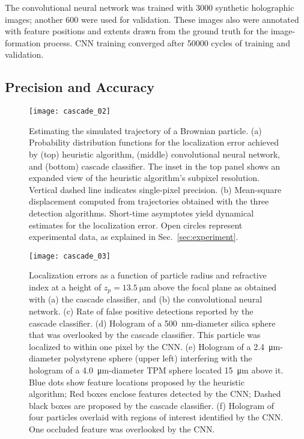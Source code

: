 The convolutional neural network was trained with 
\num{3000} synthetic holographic images; another \num{600} 
were used for validation.
These images also were annotated with feature positions and extents
drawn from the ground truth for the image-formation process.
CNN training converged after \num{50000} cycles
of training and validation.

\subsection{Precision and Accuracy}
  
\begin{figure}[!t]
  \centering
  \texttt{[image: cascade\_02]} %
  \caption{Estimating the simulated trajectory of a Brownian particle.
  (a) Probability distribution functions for the
  localization error achieved by (top) heuristic
  algorithm, (middle) convolutional neural network,
  and (bottom) cascade classifier. 
  The inset in the top panel shows an expanded view of the heuristic algorithm's subpixel
  resolution. Vertical dashed line indicates single-pixel
  precision.
  (b) Mean-square displacement computed from 
  trajectories obtained with the three detection algorithms.
  Short-time asymptotes yield dynamical estimates
  for the localization error.
  Open circles represent experimental data,
  as explained in Sec.~\ref{sec:experiment}\cite{hannel18}.
  }
  \label{fig:msdplot}
\end{figure}

\begin{figure}
  \centering
  \texttt{[image: cascade\_03]}
  \caption{Localization errors as a function of particle
  radius and refractive index at a height of $z_p = \SI{13.5}{\um}$
  above the focal plane as obtained with (a) the cascade classifier,
  and (b) the convolutional neural network.
  (c) Rate of false positive detections reported by the 
  cascade classifier. (d) Hologram of a \SI{500}{\nm}-diameter silica sphere that was
  overlooked by the cascade classifier.  This particle was localized
  to within one pixel by the CNN.
  (e) Hologram of a \SI{2.4}{\um}-diameter
  polystyrene sphere (upper left) interfering with the hologram of
  a \SI{4.0}{\um}-diameter TPM sphere located \SI{15}{\um} above it.
  Blue dots show feature locations proposed by the heuristic
  algorithm; Red boxes enclose features detected by the CNN; 
  Dashed black boxes are proposed by the cascade classifier.
  (f) Hologram of four particles
  overlaid with regions of interest identified by the CNN.  One
  occluded feature was overlooked by the CNN\cite{hannel18}.
  }
  \label{fig:figure3}
\end{figure}


